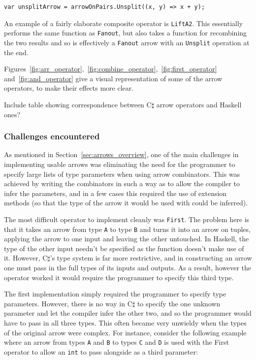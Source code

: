 \documentclass[12pt,twoside,notitlepage]{report}
\begin{document}
\begin{lstlisting}[language={[Sharp]C}]
var unsplitArrow = arrowOnPairs.Unsplit((x, y) => x + y);
\end{lstlisting}

An example of a fairly elaborate composite operator is \texttt{LiftA2}. This essentially performs the same function as \texttt{Fanout}, but also takes a function for recombining the two results and so is effectively a \texttt{Fanout} arrow with an \texttt{Unsplit} operation at the end.

Figures~\ref{fig:arr_operator},~\ref{fig:combine_operator},~\ref{fig:first_operator} and~\ref{fig:and_operator} give a visual representation of some of the arrow operators, to make their effects more clear.

Include table showing correspondence between C$\sharp$ arrow operators and Haskell ones?

\subsubsection{Challenges encountered} \label{sec:simple_arrow_challenges}

As mentioned in Section~\ref{sec:arrows_overview}, one of the main challenges in implementing usable arrows was eliminating the need for the programmer to specify large lists of type parameters when using arrow combinators. This was achieved by writing the combinators in such a way as to allow the compiler to infer the parameters, and in a few cases this required the use of extension methods (so that the type of the arrow it would be used with could be inferred).

The most difficult operator to implement cleanly was \texttt{First}. The problem here is that it takes an arrow from type \texttt{A} to type \texttt{B} and turns it into an arrow on tuples, applying the arrow to one input and leaving the other untouched. In Haskell, the type of the other input needn't be specified as the function doesn't make use of it. However, C$\sharp$'s type system is far more restrictive, and in constructing an arrow one must pass in the full types of its inputs and outputs. As a result, however the operator worked it would require the programmer to specify this third type.

The first implementation simply required the programmer to specify type parameters. However, there is no way in C$\sharp$ to specify the one unknown parameter and let the compiler infer the other two, and so the programmer would have to pass in all three types. This often became very unwieldy when the types of the original arrow were complex. For instance, consider the following example where an arrow from types \texttt{A} and \texttt{B} to types \texttt{C} and \texttt{D} is used with the First operator to allow an \texttt{int} to pass alongside as a third parameter:
\end{document}
